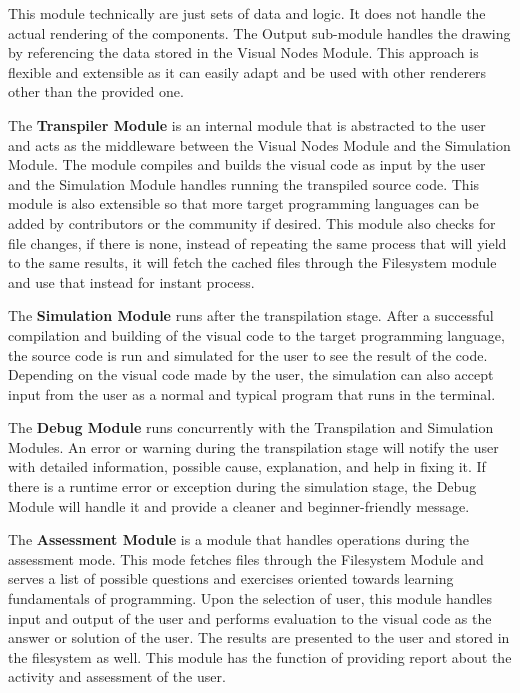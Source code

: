 \par
This module technically are just sets of data and logic. It does not handle the actual
rendering of the components. The Output sub-module handles the drawing by referencing
the data stored in the Visual Nodes Module. This approach is flexible and extensible as
it can easily adapt and be used with other renderers other than the provided one.

\par
The \textbf{Transpiler Module} is an internal module that is abstracted to the user and
acts as the middleware between the Visual Nodes Module and the Simulation Module. The
module compiles and builds the visual code as input by the user and the Simulation
Module handles running the transpiled source code.  This module is also extensible so
that more target programming languages can be added by contributors or the community if
desired. This module also checks for file changes, if there is none, instead of
repeating the same process that will yield to the same results, it will fetch the
cached files through the Filesystem module and use that instead for instant process.

\par
The \textbf{Simulation Module} runs after the transpilation stage. After a successful
compilation and building of the visual code to the target programming language, the
source code is run and simulated for the user to see the result of the code. Depending
on the visual code made by the user, the simulation can also accept input from the user
as a normal and typical program that runs in the terminal.

\par
The \textbf{Debug Module} runs concurrently with the Transpilation and Simulation Modules.
An error or warning during the transpilation stage will notify the user with detailed
information, possible cause, explanation, and help in fixing it. If there is a runtime
error or exception during the simulation stage, the Debug Module will handle it and
provide a cleaner and beginner-friendly message.

\par
The \textbf{Assessment Module} is a module that handles operations during the assessment
mode. This mode fetches files through the Filesystem Module and serves a list of possible
questions and exercises oriented towards learning fundamentals of programming. Upon the
selection of user, this module handles input and output of the user and performs
evaluation to the visual code as the answer or solution of the user. The results are
presented to the user and stored in the filesystem as well. This module has the function
of providing report about the activity and assessment of the user.\\
